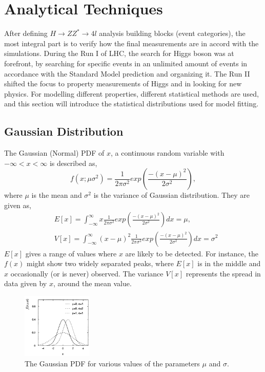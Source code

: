 \section{Analytical Techniques}
After defining $H \rightarrow ZZ^* \rightarrow 4l$ analysis building blocks (event categories), the most integral part is to verify how the final measurements are in accord with the simulations. During the Run I of LHC, the search for Higgs boson was at forefront, by searching for specific events in an unlimited amount of events in accordance with the Standard Model prediction and organizing it. The Run II shifted the focus to property measurements of Higgs and in looking for new physics. For modelling different properties, different statistical methods are used, and this section will introduce the statistical distributions used for model fitting.
\subsection{Gaussian Distribution}
\label{section:gd}
The Gaussian (Normal) PDF of $x$, a continuous random variable with $- \infty < x < \infty$ is described as,
\begin{equation}
    f (x; \mu \sigma^2) = \frac{1}{2 \pi \sigma^2} exp \left ( \frac{-(x-\mu)^2}{2 \sigma^2} \right),
\end{equation}
where $\mu$ is the mean and $\sigma^2$ is the variance of Gaussian distribution. They are given as,
\begin{equation}
    \begin{aligned}
        &E[x] = \int ^{\infty}_{- \infty} x \frac{1}{2 \pi \sigma^2} exp \left ( \frac{-(x-\mu)^2}{2 \sigma^2} \right)dx = \mu, \\
        &V[x] = \int ^{\infty}_{- \infty} (x-\mu)^2 \frac{1}{2 \pi \sigma^2} exp \left ( \frac{-(x-\mu)^2}{2 \sigma^2} \right)dx = \sigma^2
    \end{aligned}
\end{equation}
$E[x]$ gives a range of values where $x$ are likely to be detected. For instance, the $f(x)$ might show two widely separated peaks, where $E[x]$ is in the middle and $x$ occasionally (or is never) observed. The variance $V[x]$ represents the spread in data given by $x$, around the mean value.
\begin{figure}[h]
\centering
\includegraphics[width=0.3\textwidth]{images/var.png}
\caption{The Gaussian PDF for various values of the parameters $\mu$ and               $\sigma$.}
\label{fig:var}
\end{figure}
